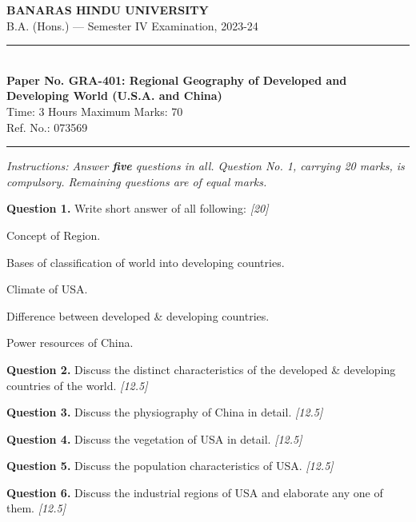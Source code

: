\documentclass[11pt,a4paper]{article}
\newcommand{\pts}[1]{\hfill   \textit{[#1]}}
\begin{document}
\begin{center}
  {\large\bfseries BANARAS HINDU UNIVERSITY}\\[2pt]
  {\normalsize B.A. (Hons.) --- Semester IV Examination, 2023-24}\\[6pt]
  \rule{0.8\linewidth}{0.5pt}\\[6pt]
  {\large\bfseries Paper No. GRA-401: Regional Geography of Developed and Developing World (U.S.A. and China)}\\[4pt]
  {\normalsize Time: 3 Hours \hfill Maximum Marks: 70}\\[2pt]
  {\small Ref. No.: 073569}
\end{center}
\rule{\linewidth}{0.4pt}
\smallskip



\noindent   \textit{Instructions: Answer   \textbf{five} questions in all. Question No. 1, carrying 20 marks, is compulsory. Remaining questions are of equal marks.}
\bigskip




\noindent   \textbf{Question 1.} Write short answer of all following: \pts{20}

\begin{parts}
  \item Concept of Region.
  \item Bases of classification of world into developing countries.
  \item Climate of USA.
  \item Difference between developed \& developing countries.
  \item Power resources of China.
\end{parts}

\medskip


\noindent   \textbf{Question 2.} Discuss the distinct characteristics of the developed \& developing countries of the world. \pts{12.5}

\medskip


\noindent   \textbf{Question 3.} Discuss the physiography of China in detail. \pts{12.5}

\medskip


\noindent   \textbf{Question 4.} Discuss the vegetation of USA in detail. \pts{12.5}

\medskip


\noindent   \textbf{Question 5.} Discuss the population characteristics of USA. \pts{12.5}

\medskip


\noindent   \textbf{Question 6.} Discuss the industrial regions of USA and elaborate any one of them. \pts{12.5}
\end{document}
